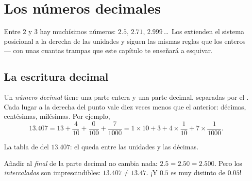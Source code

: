 \chapter{Los números decimales}\label{ch:g6:decimals}

Entre $2$ y $3$ hay muchísimos números: $2.5$, $2.71$,
$2.999$\,\dots\ Los  extienden el sistema posicional a la
derecha de las unidades y siguen las mismas reglas que los enteros ---
con unas cuantas trampas que este capítulo te enseñará a esquivar.

\section{La escritura decimal}

\begin{definition}\label{def:g6:decimals:places}
Un \emph{número decimal} tiene una parte entera y una
parte decimal, separadas por el . Cada lugar a la derecha
del punto vale diez veces menos que el anterior: décimas,
centésimas, milésimas. Por ejemplo,
\[
13.407 = 13 + \frac{4}{10} + \frac{0}{100} + \frac{7}{1000}
= 1 \times 10 + 3 + 4 \times \frac{1}{10} + 7 \times \frac{1}{1000}.
\]
\end{definition}

\begin{omfigure}

{\small La tabla de  del $13.407$: el  queda
entre las unidades y las décimas.}
\end{omfigure}

\begin{remark}
Añadir  al \emph{final} de la parte decimal no cambia nada:
$2.5 = 2.50 = 2.500$. Pero los  \emph{intercalados} son imprescindibles:
$13.407 \neq 13.47$. ¡Y $0.5$ es muy distinto de $0.05$!
\end{remark}

